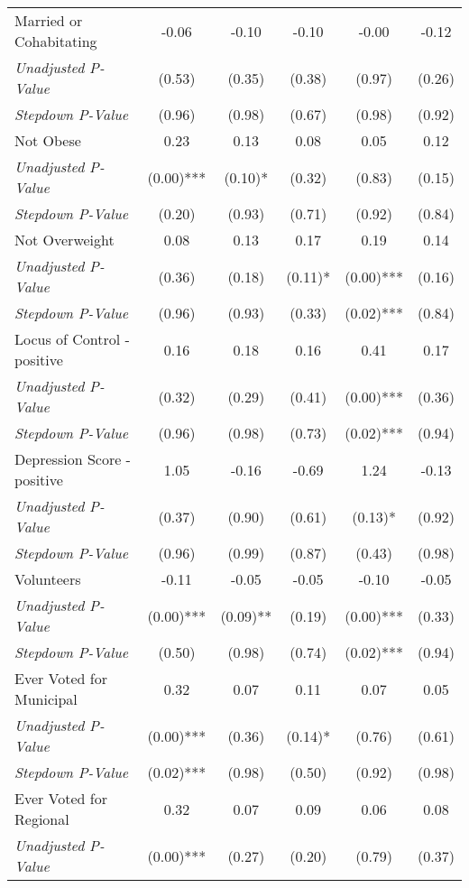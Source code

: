 \begin{tabular}{l c c c c c}
Married or Cohabitating & -0.06 & -0.10 & -0.10 & -0.00 & -0.12 \\
\quad \textit{Unadjusted P-Value} & (0.53) & (0.35) & (0.38) & (0.97) & (0.26) \\
\quad \textit{Stepdown P-Value} & (0.96) & (0.98) & (0.67) & (0.98) & (0.92) \\
Not Obese & 0.23 & 0.13 & 0.08 & 0.05 & 0.12 \\
\quad \textit{Unadjusted P-Value} & (0.00)*** & (0.10)* & (0.32) & (0.83) & (0.15) \\
\quad \textit{Stepdown P-Value} & (0.20) & (0.93) & (0.71) & (0.92) & (0.84) \\
Not Overweight & 0.08 & 0.13 & 0.17 & 0.19 & 0.14 \\
\quad \textit{Unadjusted P-Value} & (0.36) & (0.18) & (0.11)* & (0.00)*** & (0.16) \\
\quad \textit{Stepdown P-Value} & (0.96) & (0.93) & (0.33) & (0.02)*** & (0.84) \\
Locus of Control - positive & 0.16 & 0.18 & 0.16 & 0.41 & 0.17 \\
\quad \textit{Unadjusted P-Value} & (0.32) & (0.29) & (0.41) & (0.00)*** & (0.36) \\
\quad \textit{Stepdown P-Value} & (0.96) & (0.98) & (0.73) & (0.02)*** & (0.94) \\
Depression Score - positive & 1.05 & -0.16 & -0.69 & 1.24 & -0.13 \\
\quad \textit{Unadjusted P-Value} & (0.37) & (0.90) & (0.61) & (0.13)* & (0.92) \\
\quad \textit{Stepdown P-Value} & (0.96) & (0.99) & (0.87) & (0.43) & (0.98) \\
Volunteers & -0.11 & -0.05 & -0.05 & -0.10 & -0.05 \\
\quad \textit{Unadjusted P-Value} & (0.00)*** & (0.09)** & (0.19) & (0.00)*** & (0.33) \\
\quad \textit{Stepdown P-Value} & (0.50) & (0.98) & (0.74) & (0.02)*** & (0.94) \\
Ever Voted for Municipal & 0.32 & 0.07 & 0.11 & 0.07 & 0.05 \\
\quad \textit{Unadjusted P-Value} & (0.00)*** & (0.36) & (0.14)* & (0.76) & (0.61) \\
\quad \textit{Stepdown P-Value} & (0.02)*** & (0.98) & (0.50) & (0.92) & (0.98) \\
Ever Voted for Regional & 0.32 & 0.07 & 0.09 & 0.06 & 0.08 \\
\quad \textit{Unadjusted P-Value} & (0.00)*** & (0.27) & (0.20) & (0.79) & (0.37) \\

\end{tabular}
